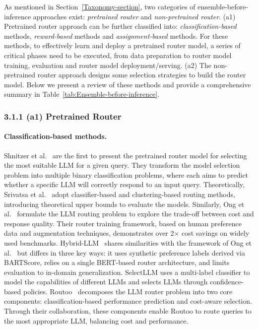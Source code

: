 \documentclass{article}
\begin{document}
As mentioned in Section~\ref{Taxonomy-section}, two categories of ensemble-before-inference approaches exist: 
\textit{pretrained router} and \textit{non-pretrained router}.
(a1) Pretrained router approach can be further classified into: 
\textit{classification-based} methods, \textit{reward-based} methods and \textit{assignment-based} methods.
For these methods, to effectively learn and deploy a pretrained router model, 
a series of critical phases need to be executed, from data
preparation to router model training, evaluation and router model deployment/serving.
(a2)
The non-pretrained router approach designs some selection strategies to build the router model. 
Below we present a review of these methods and provide a comprehensive summary in Table~\ref{tab:Ensemble-before-inference}.











\subsubsection{3.1.1 (a1) Pretrained Router}

\paragraph{Classification-based methods.}
Shnitzer et al.~ are the first to present the pretrained router model for selecting the most suitable LLM for a given query.
They transform the model selection problem into multiple binary classification problems, where each aims to predict whether a specific LLM will correctly respond to an input query. 
Theoretically, Srivatsa et al.~ adopt classifier-based and clustering-based routing methods, introducing theoretical upper bounds to evaluate the models.
Similarly, Ong et al.~ formulate the LLM routing problem to explore the trade-off between cost and response quality. 
Their router training framework, based on human preference data and augmentation techniques, demonstrates over 2$\times$ cost savings on widely used benchmarks. Hybrid-LLM~\cite{dinghybrid} shares similarities with the framework of Ong et al.~ but differs in three key ways: it uses synthetic preference labels derived via BARTScore, relies on a single BERT-based router architecture, and limits evaluation to in-domain generalization.
SelectLLM \cite{maurya2024selectllm} uses a multi-label classifier to model the capabilities of different LLMs and selects LLMs through confidence-based policies.
Routoo~\cite{mohammadshahi2024routoo} decomposes the LLM router problem into two core components: classification-based performance prediction and cost-aware selection.
Through their collaboration, these components enable Routoo to route queries to the most appropriate LLM, balancing cost and performance.
\end{document}
